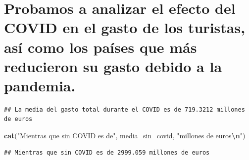 \documentclass[data,article,submit,moreauthors,pdftex]{Definitions/mdpi}
\newenvironment{Shaded}{\begin{snugshade}}{\end{snugshade}}
\newcommand{\DecValTok}[1]{\textcolor[rgb]{0.00,0.00,0.81}{#1}}
\newcommand{\FunctionTok}[1]{\textcolor[rgb]{0.13,0.29,0.53}{\textbf{#1}}}
\newcommand{\NormalTok}[1]{#1}
\newcommand{\OtherTok}[1]{\textcolor[rgb]{0.56,0.35,0.01}{#1}}
\newcommand{\SpecialCharTok}[1]{\textcolor[rgb]{0.81,0.36,0.00}{\textbf{#1}}}
\newcommand{\StringTok}[1]{\textcolor[rgb]{0.31,0.60,0.02}{#1}}
\begin{document}
\section{Probamos a analizar el efecto del COVID en el gasto de los
turistas, así como los países que más reducieron su gasto debido a la
pandemia.}\label{probamos-a-analizar-el-efecto-del-covid-en-el-gasto-de-los-turistas-asuxed-como-los-pauxedses-que-muxe1s-reducieron-su-gasto-debido-a-la-pandemia.}

\begin{Shaded}
\end{Shaded}

\begin{verbatim}
## La media del gasto total durante el COVID es de 719.3212 millones de euros
\end{verbatim}

\begin{Shaded}
\begin{Highlighting}[]
\FunctionTok{cat}\NormalTok{(}\StringTok{"Mientras que sin COVID es de"}\NormalTok{, media\_sin\_covid, }\StringTok{"millones de euros}\SpecialCharTok{\textbackslash{}n}\StringTok{"}\NormalTok{)}
\end{Highlighting}
\end{Shaded}

\begin{verbatim}
## Mientras que sin COVID es de 2999.059 millones de euros
\end{verbatim}
\end{document}
